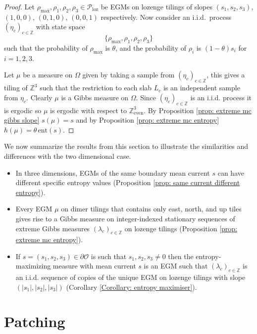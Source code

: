 \documentclass[11pt]{article}
\theoremstyle{remark}
\theoremstyle{definition}
\newcommand{\Z}{\mathbb{Z}}
\newcommand{\Prob}{\mathcal P}
\newcommand{\ent}{\text{ent}}
\newcommand{\threeeven}{\Z^3_{\text{even}}}
\newcommand{\mc}[1]{\mathcal{#1}}
\newcommand{\m}[1]{\mathbb{#1}}
\begin{document}
\begin{proof}
Let $\rho_{\max}, \rho_1, \rho_2, \rho_3\in \Prob_{\text{loz}}$ be EGMs on lozenge tilings of slopes $(s_1,s_2,s_3)$, $(1,0,0)$, $(0,1,0)$, $(0,0,1)$ respectively. Now consider an i.i.d.\ process $(\eta_c)_{c\in \Z}$ with state space 
$$\{\rho_{\max}, \rho_1, \rho_2, \rho_3\}$$
such that the probability of $\rho_{\max}$ is $\theta$, and the probability of $\rho_i$ is $(1-\theta) s_i$ for $i=1,2,3$. 

Let $\mu$ be a measure on $\Omega$ given by taking a sample from $(\eta_c)_{c\in \m Z}$, this gives a tiling of $\m Z^3$ such that the restriction to each slab $L_c$ is an independent sample from $\eta_c$. Clearly $\mu$ is a Gibbs measure on $\Omega$. Since $(\eta_c)_{c\in \m Z}$ is an i.i.d. process it is ergodic so $\mu$ is ergodic with respect to $\threeeven$. By Proposition \ref{prop: extreme mc gibbs slope} $s(\mu) = s$ and by Proposition \ref{prop: extreme mc entropy} $h(\mu) = \theta \, \ent(s)$. 
\end{proof}

We now summarize the results from this section to illustrate the similarities and differences with the two dimensional case.

\begin{itemize}
    \item In three dimensions, EGMs of the same boundary mean current $s$ can have different specific entropy values (Proposition \ref{prop: same current different entropy}).
 	\item Every EGM $\mu$ on dimer tilings that contains only east, north, and up  tiles gives rise to a Gibbs measure on integer-indexed stationary sequences of extreme Gibbs measures $(\lambda_c)_{c\in \Z}$ on lozenge tilings (Proposition \ref{prop: extreme mc entropy}). 
 	\item If $s=(s_1, s_2, s_3)\in \partial \mc O$ is such that $s_1, s_2, s_3\neq 0$ then the entropy-maximizing measure with mean current $s$ is an EGM such that $(\lambda_c)_{c\in \m Z}$ is an i.i.d. sequence of copies of the unique EGM on lozenge tilings with slope $(|s_1|,|s_2|,|s_3|)$ (Corollary \ref{Corollary: entropy maximiser}).
\end{itemize}



\section{Patching}\label{sec:patching plus hall}
\end{document}
